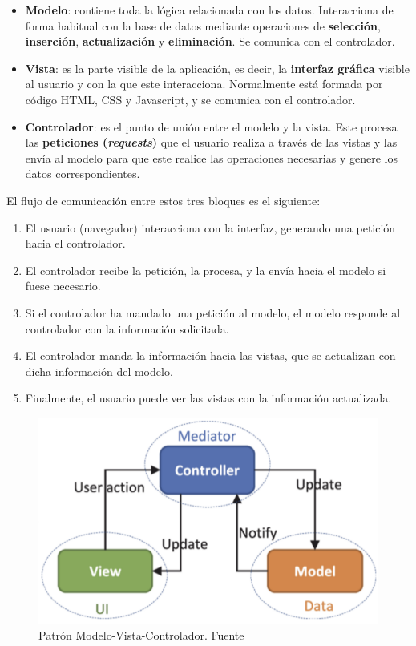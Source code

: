     \begin{itemize}
        \item \textbf{Modelo}: contiene toda la lógica relacionada con los datos.
        Interacciona de forma habitual con la base de datos mediante operaciones de
        \textbf{selección}, \textbf{inserción}, \textbf{actualización} y \textbf{eliminación}.
        Se comunica con el controlador.
        \item \textbf{Vista}: es la parte visible de la aplicación, es decir, la 
        \textbf{interfaz gráfica} visible al usuario y con la que este interacciona.
        Normalmente está formada por código HTML, CSS y Javascript, y se comunica con el
        controlador.
        \item \textbf{Controlador}: es el punto de unión entre el modelo y la vista. Este
        procesa las \textbf{peticiones (\textit{requests})} que el usuario realiza a través
        de las vistas y las envía al modelo para que este realice las operaciones necesarias
        y genere los datos correspondientes.
    \end{itemize}

El flujo de comunicación entre estos tres bloques es el siguiente:

    \begin{enumerate}
        \item El usuario (navegador) interacciona con la interfaz, generando una petición
        hacia el controlador.
        \item El controlador recibe la petición, la procesa, y la envía hacia el modelo
        si fuese necesario.
        \item Si el controlador ha mandado una petición al modelo, el modelo responde al
        controlador con la información solicitada. 
        \item El controlador manda la información hacia las vistas, que se actualizan con
        dicha información del modelo.
        \item Finalmente, el usuario puede ver las vistas con la información actualizada.
    \end{enumerate}

    \begin{figure}[H]
        \centering
        \includegraphics[scale=0.50]{imagenes/mvc.png}
        \caption[Patrón Modelo-Vista-Controlador]{Patrón Modelo-Vista-Controlador. Fuente \cite{mvc}}
        \label{fig:mvc}
    \end{figure}

